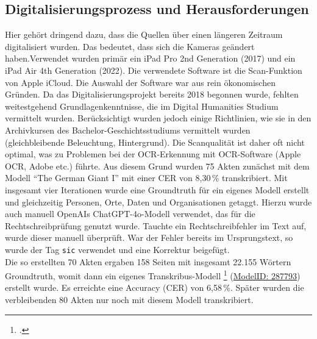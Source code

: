 \documentclass[12pt, a4paper, ngerman, bidi=default]{article}
\let\cite\footcite
\begin{document}
    \begin{description}

\subsection{Digitalisierungsprozess und Herausforderungen}

Hier gehört dringend dazu, dass die Quellen über einen längeren Zeitraum digitalisiert wurden. 
Das bedeutet, dass sich die Kameras geändert haben.Verwendet wurden primär ein iPad Pro 2nd Generation (2017) und ein iPad Air 4th Generation (2022). 
Die verwendete Software ist die Scan-Funktion von Apple iCloud. 
Die Auswahl der Software war aus rein ökonomischen Gründen. Da das Digitalisierungsprojekt bereits 2018 begonnen wurde, fehlten weitestgehend Grundlagenkenntnisse, 
die im Digital Humanities Studium vermittelt wurden. Berücksichtigt wurden jedoch einige Richtlinien, wie sie in den Archivkursen des Bachelor-Geschichtsstudiums vermittelt wurden 
(gleichbleibende Beleuchtung, Hintergrund). Die Scanqualität ist daher oft nicht optimal, was zu Problemen bei der OCR-Erkennung mit OCR-Software (Apple OCR, Adobe etc.) führte. 
Aus diesem Grund wurden 75 Akten zunächst mit dem Modell \enquote{The German Giant I} mit einer CER von 8,30\,\% transkribiert. Mit insgesamt vier Iterationen wurde eine Groundtruth 
für ein eigenes Modell erstellt und gleichzeitig Personen, Orte, Daten und Organisationen getaggt. Hierzu wurde auch manuell OpenAIs ChatGPT-4o-Modell verwendet, 
das für die Rechtschreibprüfung genutzt wurde. Tauchte ein Rechtschreibfehler im Text auf, wurde dieser manuell überprüft. War der Fehler bereits im Ursprungstext, 
so wurde der Tag \texttt{sic} verwendet und eine Korrektur beigefügt.\\

Die so erstellten 70 Akten ergaben 158 Seiten mit insgesamt 22.155 Wörtern Groundtruth, womit dann ein eigenes Transkribus-Modell \cite{burkhardt_transkribus_2024}
(\href{https://app.transkribus.org/models/public/287793}{ModelID: 287793}) erstellt wurde. Es erreichte eine Accuracy (CER) von 6,58\,\%. Später wurden die verbleibenden 
80 Akten nur noch mit diesem Modell transkribiert.\\


\end{description}
\end{document}
